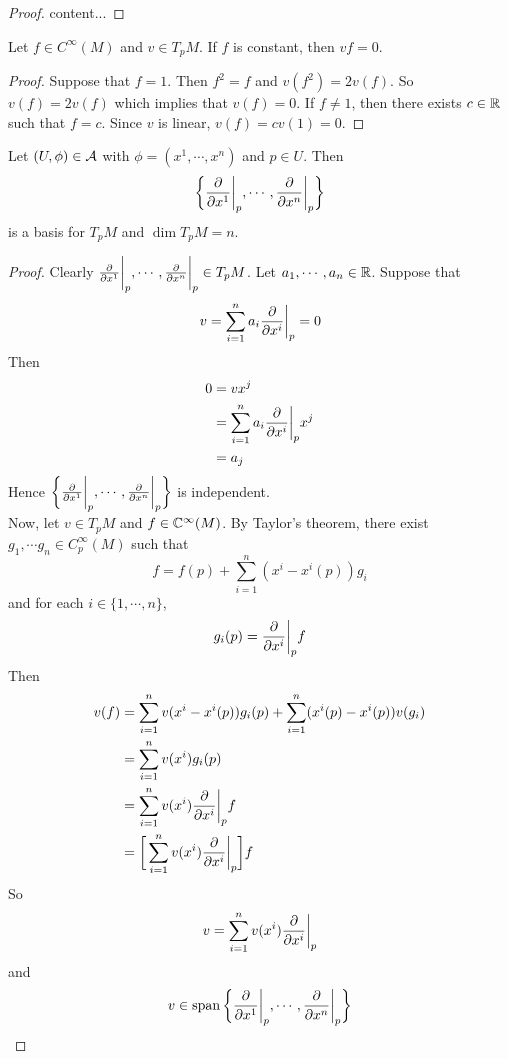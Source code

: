 \documentclass{book}
\begin{document}
	\begin{ex}
	\end{ex}

	\begin{proof}
		content...
	\end{proof}

	\begin{ex}
		Let $f \in C^{\infty}(M)$ and $v \in T_pM$. If $f$ is constant, then $vf = 0$.
	\end{ex}

	\begin{proof}
		Suppose that $f = 1$. Then $f^2 = f$ and $v(f^2) = 2v(f)$. So $v(f) = 2v(f)$ which implies that $v(f) = 0$. If $f \neq 1$, then there exists $c \in \mathbb{R}$ such that $f = c$. Since $v$ is linear, $v(f) = cv(1) = 0$.
	\end{proof}

	\begin{ex}
		Let $(U, \phi) \in \mathcal{A}$ with $\phi = (x^1, \cdots, x^n)$ and $p \in U$. Then $$ \bigg \{\frac{\partial}{\partial x^1} \bigg|_p, \cdots, \frac{\partial}{\partial x^n} \bigg|_p \bigg \}$$ is a basis for $T_pM$ and $\dim T_pM = n$.
	\end{ex}

	\begin{proof}
		Clearly $\frac{\partial}{\partial x^1} \bigg|_p, \cdots, \frac{\partial}{\partial x^n} \bigg|_p \in T_pM$. Let $a_1, \cdots, a_n \in \mathbb{R}$. Suppose that $$v = \sum_{i=1}^n a_i \frac{\partial}{\partial x^i} \bigg |_p  = 0$$
		Then 
		\begin{align*}
			0
			&= v x^j \\
			&= \sum_{i=1}^n a_i \frac{\partial}{\partial x^i} \bigg |_p  x^j \\
			&= a_j
		\end{align*}
		Hence $\bigg \{\frac{\partial}{\partial x^1} \bigg|_p, \cdots, \frac{\partial}{\partial x^n} \bigg|_p \bigg \}$ is independent.\\
		Now, let $v \in T_pM$ and $f \in \mathbb{C}^{\infty}(M)$. By Taylor's theorem, there exist $g_1, \cdots g_n \in C_p^{\infty}(M)$ such that $$f = f(p) + \sum_{i=1}^n(x^i - x^i(p)) g_i$$ and for each $i \in \{1, \cdots, n\}$, $$g_i(p) = \frac{\partial}{\partial x^i} \bigg |_p  f $$ Then 
		\begin{align*}
			v(f)
			&= \sum_{i=1}^nv(x^i - x^i(p)) g_i(p) + \sum_{i=1}^n(x^i(p) - x^i(p)) v(g_i) \\
			&= \sum_{i=1}^nv(x^i)g_i(p) \\
			&= \sum_{i=1}^nv(x^i)\frac{\partial}{\partial x^i} \bigg |_p  f \\
			&= \bigg[ \sum_{i=1}^nv(x^i)\frac{\partial}{\partial x^i} \bigg |_p  \bigg] f
		\end{align*}
		So $$v = \sum_{i=1}^nv(x^i)\frac{\partial}{\partial x^i} \bigg |_p  $$ and $$v \in \operatorname{span} \bigg \{\frac{\partial}{\partial x^1} \bigg|_p, \cdots, \frac{\partial}{\partial x^n} \bigg|_p \bigg \}$$
	\end{proof}
\end{document}
